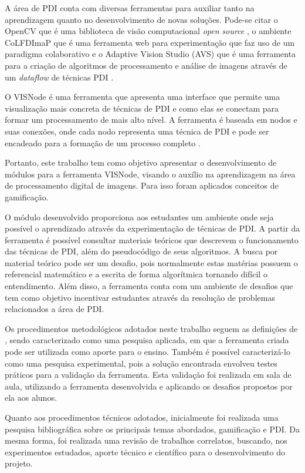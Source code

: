 \documentclass[
	12pt,				%
	oneside,			%
	a4paper,			%
	english,			%
	french,				%
	spanish,			%
	brazil,				%
	]{abntex2}
\begin{document}
A área de PDI conta com diversas ferramentas para auxiliar tanto na aprendizagem quanto no desenvolvimento de novas soluções. Pode-se citar o OpenCV que é uma biblioteca de visão computacional \textit{open source} \cite{pulli2012realtime}, o ambiente CoLFDImaP que é uma ferramenta web para experimentação que faz uso de um paradigma colaborativo \cite{garcia2015colfdimap} e o Adaptive Vision Studio (AVS) que é uma ferramenta para a criação de algoritmos de processamento e análise de imagens através de um \textit{dataflow} de técnicas PDI \cite{radlak2015adaptive}.

O VISNode é uma ferramenta que apresenta uma interface que permite uma visualização mais concreta de técnicas de PDI e como elas se conectam para formar um processamento de mais alto nível. A ferramenta é baseada em nodos e suas conexões, onde cada nodo representa uma técnica de PDI e pode ser encadeado para a  formação de um processo completo  \cite{visnode}.

Portanto, este trabalho tem como objetivo apresentar o desenvolvimento de módulos para a ferramenta VISNode, visando o auxílio na aprendizagem na área de processamento digital de imagens. Para isso foram aplicados conceitos de gamificação. 

O módulo desenvolvido proporciona aos estudantes um ambiente onde seja possível o aprendizado através da experimentação de técnicas de PDI. A partir da ferramenta é possível consultar materiais teóricos que descrevem o funcionamento das técnicas de PDI, além do pseudocódigo de seus algoritmos. A busca por material teórico pode ser um desafio, pois normalmente estas matérias possuem o referencial matemático e a escrita de forma algorítmica tornando difícil o entendimento. Além disso, a ferramenta conta com um ambiente de desafios que tem como objetivo incentivar estudantes através da resolução de problemas relacionados a área de PDI.

Os procedimentos metodológicos adotados neste trabalho seguem as definições de \cite{prodanov2013metodologia}, sendo caracterizado como uma pesquisa aplicada, em que a ferramenta criada pode ser utilizada como aporte para o ensino. Também é possível caracterizá-lo como uma pesquisa experimental, pois a solução encontrada envolveu testes práticos para a validação da ferramenta. Esta validação foi realizada em sala de aula, utilizando a ferramenta desenvolvida e aplicando os desafios propostos por ela aos alunos.

Quanto aos procedimentos técnicos adotados, inicialmente foi realizada uma pesquisa bibliográfica sobre os principais temas abordados, gamificação e PDI. Da mesma forma, foi realizada uma revisão de trabalhos correlatos, buscando, nos experimentos estudados, aporte técnico e científico para o desenvolvimento do projeto.
\end{document}
